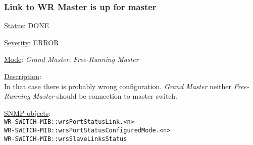 \subsubsection{\bf Link to WR Master is up for master}
		\label{fail:timing:master_up}
		\begin{packed_enum}
			\item [] \underline{Status}: DONE
			\item [] \underline{Severity}: ERROR
			\item [] \underline{Mode}: \emph{Grand Master}, \emph{Free-Running Master}
			\item [] \underline{Description}:\\
				In that case there is probably wrong configuration.
				\emph{Grand Master} neither \emph{Free-Running Master}
				should be connection to master switch.
			\item [] \underline{SNMP objects}:\\
				\texttt{WR-SWITCH-MIB::wrsPortStatusLink.<n>}\\
				\texttt{WR-SWITCH-MIB::wrsPortStatusConfiguredMode.<n>}\\
				\texttt{WR-SWITCH-MIB::wrsSlaveLinksStatus}
		\end{packed_enum}


